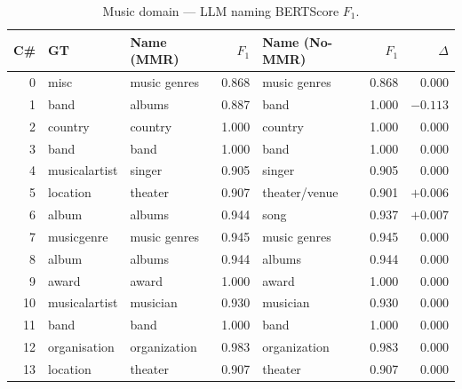 \documentclass[11pt,a4paper]{article}
\begin{document}
\begin{table}[h]
\centering
\caption{Music domain --- LLM naming BERTScore $F_1$.}
\label{tab:music}
\small
\setlength{\tabcolsep}{4pt}
\begin{tabular}{r l l r l r r}
\toprule
\textbf{C\#} & \textbf{GT} &
  \textbf{Name (MMR)} & \textbf{$F_1$} &
  \textbf{Name (No-MMR)} & \textbf{$F_1$} &
  \textbf{$\Delta$} \\
\midrule
0  & misc          & music genres    & \cellcolor{red!15}0.868 & music genres  & \cellcolor{red!15}0.868 & $0.000$ \\
1  & band          & albums          & \cellcolor{red!15}0.887 & band          & \cellcolor{green!15}1.000 & $-0.113$ \\
2  & country       & country         & \cellcolor{green!15}1.000 & country      & \cellcolor{green!15}1.000 & $0.000$ \\
3  & band          & band            & \cellcolor{green!15}1.000 & band         & \cellcolor{green!15}1.000 & $0.000$ \\
4  & musicalartist & singer          & \cellcolor{yellow!25}0.905 & singer       & \cellcolor{yellow!25}0.905 & $0.000$ \\
5  & location      & theater         & \cellcolor{yellow!25}0.907 & theater/venue & \cellcolor{yellow!25}0.901 & $+0.006$ \\
6  & album         & albums          & \cellcolor{yellow!25}0.944 & song         & \cellcolor{yellow!25}0.937 & $+0.007$ \\
7  & musicgenre    & music genres    & \cellcolor{yellow!25}0.945 & music genres & \cellcolor{yellow!25}0.945 & $0.000$ \\
8  & album         & albums          & \cellcolor{yellow!25}0.944 & albums       & \cellcolor{yellow!25}0.944 & $0.000$ \\
9  & award         & award           & \cellcolor{green!15}1.000 & award        & \cellcolor{green!15}1.000 & $0.000$ \\
10 & musicalartist & musician        & \cellcolor{yellow!25}0.930 & musician     & \cellcolor{yellow!25}0.930 & $0.000$ \\
11 & band          & band            & \cellcolor{green!15}1.000 & band         & \cellcolor{green!15}1.000 & $0.000$ \\
12 & organisation  & organization    & \cellcolor{yellow!25}0.983 & organization & \cellcolor{yellow!25}0.983 & $0.000$ \\
13 & location      & theater         & \cellcolor{yellow!25}0.907 & theater      & \cellcolor{yellow!25}0.907 & $0.000$ \\

\end{tabular}
\end{table}
\end{document}
